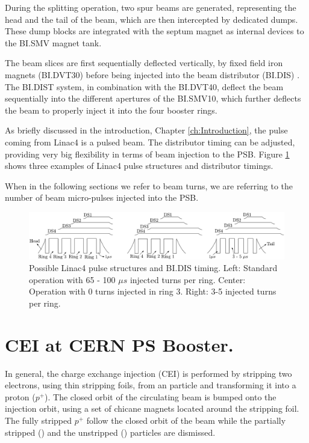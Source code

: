 During the splitting operation, two spur beams are generated, representing the head and the tail of the beam, which are then intercepted by dedicated dumps. These dump blocks are integrated with the septum magnet as internal devices to the BI.SMV magnet tank.

The beam slices are first sequentially deflected vertically, by fixed field iron magnets (BI.DVT30) before being injected into the beam distributor (BI.DIS) \parencite[][]{ref:DIST}. The BI.DIST system, in combination with the BI.DVT40, deflect the beam sequentially into the different apertures of the BI.SMV10, which further deflects the beam to properly inject it into the four booster rings. 

As briefly discussed in the introduction, Chapter \ref{ch:Introduction}, the pulse coming from Linac4 is a pulsed beam. The distributor timing can be adjusted, providing very big flexibility in terms of beam injection to the PSB. Figure \ref{fig:DistTiming} shows three examples of Linac4 pulse structures and distributor timings. 

When in the following sections we refer to beam turns, we are referring to the number of beam micro-pulses injected into the PSB. 

\begin{figure}[h]
    \centering
    \includegraphics[width=1.0\columnwidth]{Figure_DistTiming/DistTiming.pdf}
    \caption{Possible Linac4 pulse structures and BI.DIS timing. Left: Standard operation with 65 - 100 $\mu s$ injected turns per ring. Center: Operation with 0 turns injected in ring 3. Right: 3-5 injected turns per ring.  }
    \label{fig:DistTiming}
\end{figure}


\section{CEI at CERN PS Booster.}
\label{sec:CEI}

In general, the charge exchange injection (CEI) is performed by stripping two electrons, using thin stripping foils,  from an \hm particle and transforming it into a proton ($p^{+}$).  The closed orbit of the circulating beam is bumped onto the injection orbit, using a set of chicane magnets located around the stripping foil. The fully stripped $p^{+}$ follow the closed orbit of the beam while the partially stripped (\hzz) and the unstripped (\hm) particles are dismissed. 

